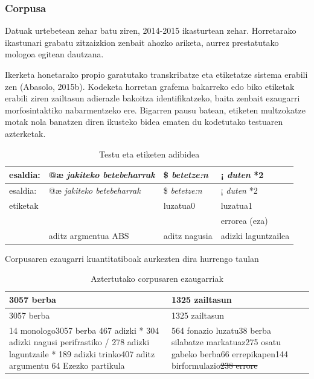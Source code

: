 \documentclass[]{article}
\begin{document}
\subsubsection{Corpusa}\label{corpusa}

Datuak urtebetean zehar batu ziren, 2014-2015 ikasturtean zehar.
Horretarako ikastunari grabatu zitzaizkion zenbait ahozko ariketa,
aurrez prestatutako mologoa egitean dautzana.

Ikerketa honetarako propio garatutako transkribatze eta etiketatze
sistema erabili zen (Abasolo, 2015b). Kodeketa horretan grafema
bakarreko edo biko etiketak erabili ziren zailtasun adierazle bakoitza
identifikatzeko, baita zenbait ezaugarri morfosintaktiko nabarmentzeko
ere. Bigarren pausu batean, etiketen multzokatze motak nola banatzen
diren ikusteko bidea ematen du kodetutako testuaren azterketak.

\begin{longtable}[]{@{}llll@{}}
\caption{Testu eta etiketen adibidea}\tabularnewline
\toprule
esaldia: & @æ \emph{jakiteko betebeharrak} & \$ \emph{betetze:n} & ¡
\emph{duten} *2\tabularnewline
\midrule
\endfirsthead
\toprule
esaldia: & @æ \emph{jakiteko betebeharrak} & \$ \emph{betetze:n} & ¡
\emph{duten} *2\tabularnewline
\midrule
\endhead
etiketak & & luzatua0 & luzatua1\tabularnewline
& & & errorea (eza)\tabularnewline
& aditz argmentua ABS & aditz nagusia & adizki
laguntzailea\tabularnewline
\bottomrule
\end{longtable}

Corpusaren ezaugarri kuantitatiboak aurkezten dira hurrengo taulan

\begin{longtable}[]{@{}ll@{}}
\caption{Aztertutako corpusaren ezaugarriak}\tabularnewline
\toprule
\begin{minipage}[b]{0.47\columnwidth}\raggedright\strut
3057 berba\strut
\end{minipage} & \begin{minipage}[b]{0.47\columnwidth}\raggedright\strut
1325 zailtasun\strut
\end{minipage}\tabularnewline
\midrule
\endfirsthead
\toprule
\begin{minipage}[b]{0.47\columnwidth}\raggedright\strut
3057 berba\strut
\end{minipage} & \begin{minipage}[b]{0.47\columnwidth}\raggedright\strut
1325 zailtasun\strut
\end{minipage}\tabularnewline
\midrule
\endhead
\begin{minipage}[t]{0.47\columnwidth}\raggedright\strut
14 monologo3057 berba 467 adizki * 304 adizki nagusi perifrastiko / 278
adizki laguntzaile * 189 adizki trinko407 aditz argumentu 64 Ezezko
partikula\strut
\end{minipage} & \begin{minipage}[t]{0.47\columnwidth}\raggedright\strut
564 fonazio luzatu38 berba silabatze markatuaz275 osatu gabeko berba66
errepikapen144 birformulazio\sout{238 errore}\strut
\end{minipage}\tabularnewline
\bottomrule
\end{longtable}
\end{document}
